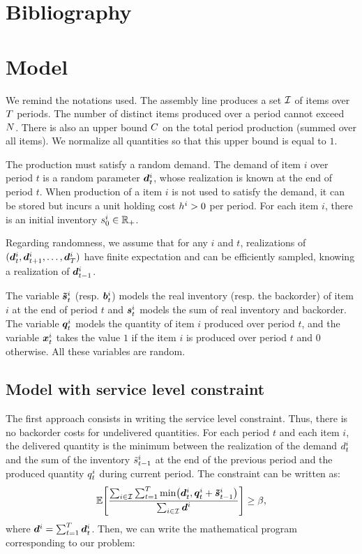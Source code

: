 \section{Bibliography}



\section{Model}


We remind the notations used. The assembly line produces a set $\mathcal{I}$ of items over $T$ periods. The number of distinct items produced over a period cannot exceed $N$. There is also an upper bound $C$ on the total period production (summed over all items). We normalize all quantities so that this upper bound is equal to $1$.

The production must satisfy a random demand. The demand of item $i$ over period $t$ is a random parameter $\va\demand_t^i$, whose realization is known at the end of period $t$. When production of a item $i$ is not used to satisfy the demand, it can be stored but incurs a unit holding cost $h^i>0$ per period. For each item $i$, there is an initial inventory $s_0^i\in\mathbb{R}_+$.

Regarding randomness, we assume that for any $i$ and $t$, realizations of $(\va\demand_t^i,\va\demand_{t+1}^i,\ldots,\va\demand_{\horizon}^i)$ have finite expectation and can be efficiently sampled, knowing a realization of $\va\demand_{t-1}^i$.

The variable $\va\excess_t^i$ (resp. $\va\backlog_t^i$) models the real inventory (resp. the backorder) of item $i$ at the end of period $t$ and $\va\inventory_t^i$ models the sum of real inventory and backorder. The variable $\va\quantity_t^i$ models the quantity of item $i$ produced over period $t$, and the variable $\va\setup_t^i$ takes the value $1$ if the item $i$ is produced over period $t$ and $0$ otherwise. All these variables are random.



\subsection{Model with service level constraint}


The first approach consists in writing the service level constraint. Thus, there is no backorder costs for undelivered quantities. For each period $t$ and each item $i$, the delivered quantity is the minimum between the realization of the demand $d_t^i$ and the sum of the inventory $\tilde{s}_{t-1}^i$ at the end of the previous period and the produced quantity $q_t^i$ during current period. The constraint can be written as:
\begin{equation}
  \label{eq:service-level-constraint}
  \espe\sqbracket{\frac{
  \sum_{i\in\REF}\sum_{t=1}^{\horizon}\min\bracket{\va \demand_t^i,\va \quantity_t^i+\va\excess_{t-1}^i}}
  {\sum_{i\in\REF}\va\demand^i}}
  \geq \servicelvl ,
\end{equation}
where $\va\demand^i=\sum_{t=1}^{\horizon}\va\demand_t^i$. Then, we can write the mathematical program corresponding to our problem:


